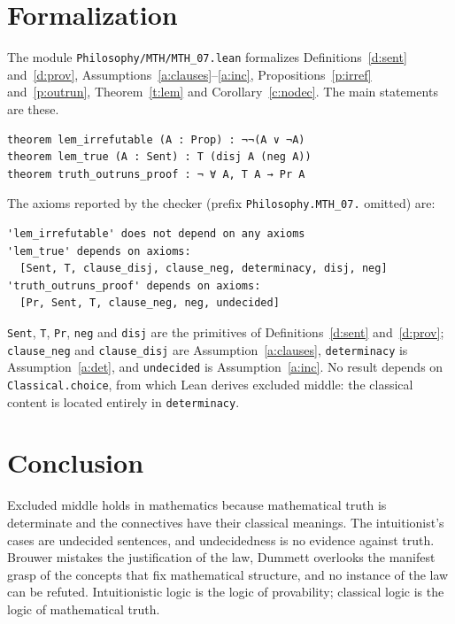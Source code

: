 \documentclass{situationist-preprint}
\begin{document}
\section{Formalization}

The module \nolinkurl{Philosophy/MTH/MTH_07.lean} formalizes Definitions~\ref{d:sent} and~\ref{d:prov}, Assumptions~\ref{a:clauses}--\ref{a:inc}, Propositions~\ref{p:irref} and~\ref{p:outrun}, Theorem~\ref{t:lem} and Corollary~\ref{c:nodec}. The main statements are these.

\begin{lstlisting}
theorem lem_irrefutable (A : Prop) : ¬¬(A ∨ ¬A)
theorem lem_true (A : Sent) : T (disj A (neg A))
theorem truth_outruns_proof : ¬ ∀ A, T A → Pr A
\end{lstlisting}

The axioms reported by the checker (prefix \texttt{Philosophy.MTH\_07.} omitted) are:

\begin{lstlisting}
'lem_irrefutable' does not depend on any axioms
'lem_true' depends on axioms:
  [Sent, T, clause_disj, clause_neg, determinacy, disj, neg]
'truth_outruns_proof' depends on axioms:
  [Pr, Sent, T, clause_neg, neg, undecided]
\end{lstlisting}

\texttt{Sent}, \texttt{T}, \texttt{Pr}, \texttt{neg} and \texttt{disj} are the primitives of Definitions~\ref{d:sent} and~\ref{d:prov}; \texttt{clause\_neg} and \texttt{clause\_disj} are Assumption~\ref{a:clauses}, \texttt{determinacy} is Assumption~\ref{a:det}, and \texttt{undecided} is Assumption~\ref{a:inc}. No result depends on \texttt{Classical.choice}, from which Lean derives excluded middle: the classical content is located entirely in \texttt{determinacy}.

\section{Conclusion}

Excluded middle holds in mathematics because mathematical truth is determinate and the connectives have their classical meanings. The intuitionist's cases are undecided sentences, and undecidedness is no evidence against truth. Brouwer mistakes the justification of the law, Dummett overlooks the manifest grasp of the concepts that fix mathematical structure, and no instance of the law can be refuted. Intuitionistic logic is the logic of provability; classical logic is the logic of mathematical truth.
\end{document}

